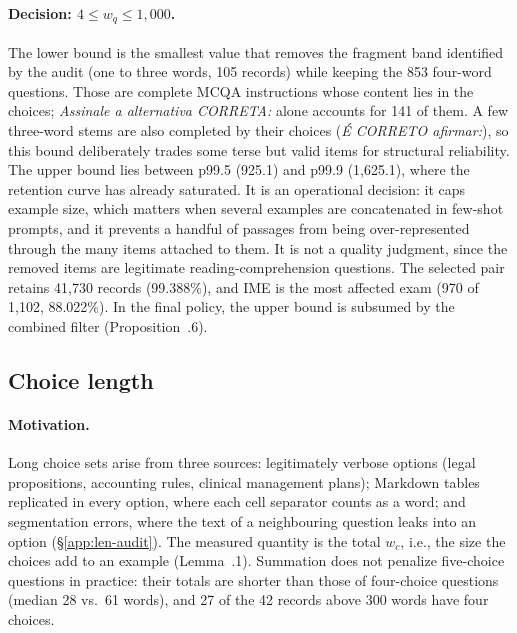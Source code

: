 \paragraph{Decision: $4 \le w_q \le 1{,}000$.} The lower bound is the
smallest value that removes the fragment band identified by the audit
(one to three words, 105 records) while keeping the 853 four-word questions.
Those are complete MCQA instructions whose content lies in the choices;
\emph{Assinale a alternativa CORRETA:} alone accounts for 141 of them. A few
three-word stems are also completed by their choices (\emph{É CORRETO
afirmar:}), so this bound deliberately trades some terse but valid items for
structural reliability. The upper bound lies between p99.5 (925.1) and p99.9
(1,625.1), where the retention curve has already saturated. It is an
operational decision: it caps example size, which matters when several
examples are concatenated in few-shot prompts, and it prevents a handful of
passages from being over-represented through the many items attached to
them. It is not a quality judgment, since the removed items are legitimate
reading-comprehension questions. The selected pair retains 41,730 records
(99.388\%), and IME is the most affected exam (970 of 1,102, 88.022\%). In
the final policy, the upper bound is subsumed by the combined filter
(Proposition~\thesection.6).

\subsection{Choice length}
\label{app:len-choices}

\paragraph{Motivation.} Long choice sets arise from three sources:
legitimately verbose options (legal propositions, accounting rules, clinical
management plans); Markdown tables replicated in every option, where each cell
separator counts as a word; and segmentation errors, where the text of a
neighbouring question leaks into an option (\S\ref{app:len-audit}). The
measured quantity is the total $w_c$, i.e., the size the choices add to an
example (Lemma~\thesection.1). Summation does not penalize five-choice
questions in practice: their totals are shorter than those of four-choice
questions (median 28 vs.\ 61 words), and 27 of the 42 records above 300 words
have four choices.

